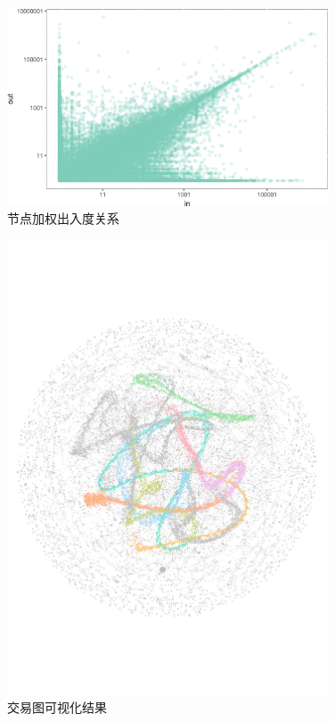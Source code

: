 \begin{figure}
	\centering
	\includegraphics[width=0.85\textwidth]{figs/nio.png}
	\caption{节点加权出入度关系}\label{fig:nio}
\end{figure}

\begin{figure}
	\centering
	\includegraphics[width=0.85\textwidth]{figs/wgc.pdf}
	\caption{交易图可视化结果}\label{fig:wgc}
\end{figure}

